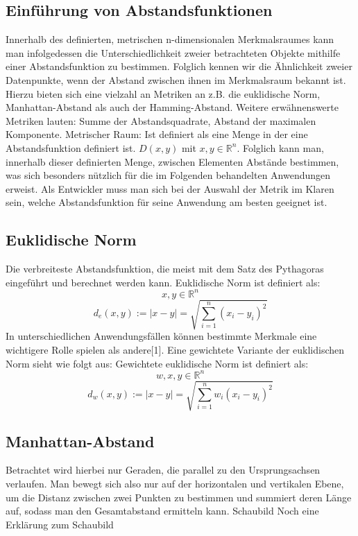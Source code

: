 \documentclass[a4paper]{scrartcl}
\begin{document}
\begin{multicols}{2}
            \subsection{Einführung von Abstandsfunktionen}
                Innerhalb des definierten, metrischen n-dimensionalen Merkmalsraumes kann man infolgedessen die Unterschiedlichkeit zweier betrachteten Objekte mithilfe einer Abstandsfunktion zu bestimmen. Folglich kennen wir die Ähnlichkeit zweier Datenpunkte, wenn der Abstand zwischen ihnen im Merkmalsraum bekannt ist. Hierzu bieten sich eine vielzahl an Metriken an z.B. die euklidische Norm, Manhattan-Abstand als auch der Hamming-Abstand. Weitere erwähnenswerte Metriken lauten: Summe der Abstandsquadrate, Abstand der maximalen Komponente. 
                Metrischer Raum: Ist definiert als eine Menge in der eine Abstandsfunktion definiert ist.
                $D(x,y)$ mit $x,y \in \mathbb{R}^n$.
                Folglich kann man, innerhalb dieser definierten Menge, zwischen Elementen Abstände bestimmen, was sich besonders nützlich für die im Folgenden behandelten Anwendungen erweist.
                Als Entwickler muss man sich bei der Auswahl der Metrik im Klaren sein, welche Abstandsfunktion für seine Anwendung am besten geeignet ist. 
            \subsection{Euklidische Norm}
                Die verbreiteste Abstandsfunktion, die meist mit dem Satz des Pythagoras eingeführt und berechnet werden kann.
                Euklidische Norm ist definiert als:
                $$ x,y \in \mathbb{R}^n $$
                $$
                    d_e(x,y):= |x - y| = \sqrt{\sum_{i=1}^{n}(x_i -y_i)^2}
                $$        
                In unterschiedlichen Anwendungsfällen können bestimmte Merkmale eine wichtigere Rolle spielen als andere[1]. Eine gewichtete Variante der euklidischen Norm sieht wie folgt aus:
                Gewichtete euklidische Norm ist definiert als:
                $$w,x,y \in \mathbb{R}^n $$
                $$
                    d_w(x,y):= |x - y| = \sqrt{\sum_{i=1}^{n}w_i(x_i -y_i)^2}
                $$     
            
            \subsection{Manhattan-Abstand}
                Betrachtet wird hierbei nur Geraden, die parallel zu den Ursprungsachsen verlaufen. Man bewegt sich also nur auf der horizontalen und vertikalen Ebene, um die Distanz zwischen zwei Punkten zu bestimmen und summiert deren Länge auf, sodass man den Gesamtabstand ermitteln kann.
                Schaubild
                Noch eine Erklärung zum Schaubild


\end{multicols}
\end{document}
